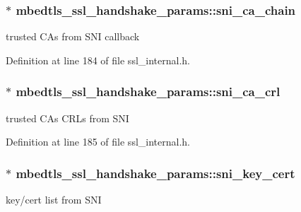 \hypertarget{structmbedtls__ssl__handshake__params_a4d18e84d136e133fe5edfff81a207168}{
\subsubsection[{sni\-\_\-ca\-\_\-chain}]{$\ast$ mbedtls\-\_\-ssl\-\_\-handshake\-\_\-params\-::sni\-\_\-ca\-\_\-chain}}\label{structmbedtls__ssl__handshake__params_a4d18e84d136e133fe5edfff81a207168}
trusted C\-As from S\-N\-I callback 

Definition at line 184 of file ssl\-\_\-internal.\-h.

\hypertarget{structmbedtls__ssl__handshake__params_ae2b1df99f674ec78b072234a0bb4fa40}{
\subsubsection[{sni\-\_\-ca\-\_\-crl}]{$\ast$ mbedtls\-\_\-ssl\-\_\-handshake\-\_\-params\-::sni\-\_\-ca\-\_\-crl}}\label{structmbedtls__ssl__handshake__params_ae2b1df99f674ec78b072234a0bb4fa40}
trusted C\-As C\-R\-Ls from S\-N\-I 

Definition at line 185 of file ssl\-\_\-internal.\-h.

\hypertarget{structmbedtls__ssl__handshake__params_abe0893bc6a388d5e2f584cd4025a76b4}{
\subsubsection[{sni\-\_\-key\-\_\-cert}]{$\ast$ mbedtls\-\_\-ssl\-\_\-handshake\-\_\-params\-::sni\-\_\-key\-\_\-cert}}\label{structmbedtls__ssl__handshake__params_abe0893bc6a388d5e2f584cd4025a76b4}
key/cert list from S\-N\-I 

